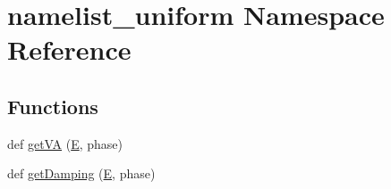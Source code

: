 \hypertarget{namespacenamelist__uniform}{}\section{namelist\+\_\+uniform Namespace Reference}
\label{namespacenamelist__uniform}
\subsection*{Functions}
\begin{DoxyCompactItemize}
\item 
def \hyperlink{namespacenamelist__uniform_aa800c838f509e9466ab83a769de6ed72}{get\+VA} (\hyperlink{namespacenamelist__uniform_ae326a4c58a1bf2113624ca242b164c87}{E}, phase)
\item 
def \hyperlink{namespacenamelist__uniform_aad345e2665220260c1a54980166d06af}{get\+Damping} (\hyperlink{namespacenamelist__uniform_ae326a4c58a1bf2113624ca242b164c87}{E}, phase)
\end{DoxyCompactItemize}
